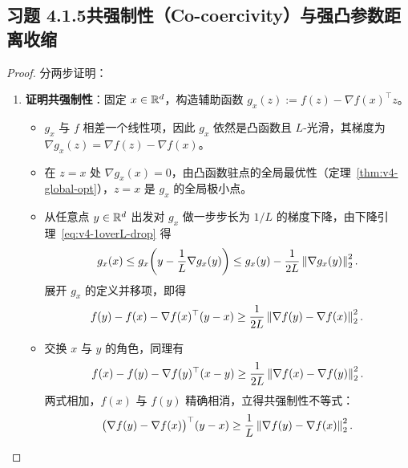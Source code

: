 \subsection*{习题 4.1.5\quad 共强制性（Co-coercivity）与强凸参数距离收缩}
\begin{proof}
分两步证明：
\begin{enumerate}[label=(\arabic*), leftmargin=1.8em]
  \item \textbf{证明共强制性}：固定 $x \in \mathbb{R}^d$，构造辅助函数 $g_x(z) := f(z) - \nabla f(x)^\top z$。
  \begin{itemize}
    \item $g_x$ 与 $f$ 相差一个线性项，因此 $g_x$ 依然是凸函数且 $L$-光滑，其梯度为 $\nabla g_x(z) = \nabla f(z) - \nabla f(x)$。
    \item 在 $z = x$ 处 $\nabla g_x(x) = 0$，由凸函数驻点的全局最优性（定理~\ref{thm:v4-global-opt}），$z = x$ 是 $g_x$ 的全局极小点。
    \item 从任意点 $y \in \mathbb{R}^d$ 出发对 $g_x$ 做一步步长为 $1/L$ 的梯度下降，由下降引理~\eqref{eq:v4-1overL-drop} 得
    \[
      g_x(x) \le g_x\!\left(y - \frac{1}{L}\nabla g_x(y)\right) \le g_x(y) - \frac{1}{2L}\left\|\nabla g_x(y)\right\|_2^2.
    \]
    展开 $g_x$ 的定义并移项，即得
    \[
      f(y) - f(x) - \nabla f(x)^\top(y - x) \ge \frac{1}{2L}\left\|\nabla f(y) - \nabla f(x)\right\|_2^2.
    \]
    \item 交换 $x$ 与 $y$ 的角色，同理有
    \[
      f(x) - f(y) - \nabla f(y)^\top(x - y) \ge \frac{1}{2L}\left\|\nabla f(x) - \nabla f(y)\right\|_2^2.
    \]
    两式相加，$f(x)$ 与 $f(y)$ 精确相消，立得共强制性不等式：
    \[
      \big(\nabla f(y) - \nabla f(x)\big)^\top(y - x) \ge \frac{1}{L}\left\|\nabla f(y) - \nabla f(x)\right\|_2^2.
    \]
  \end{itemize}


\end{enumerate}
\end{proof}

